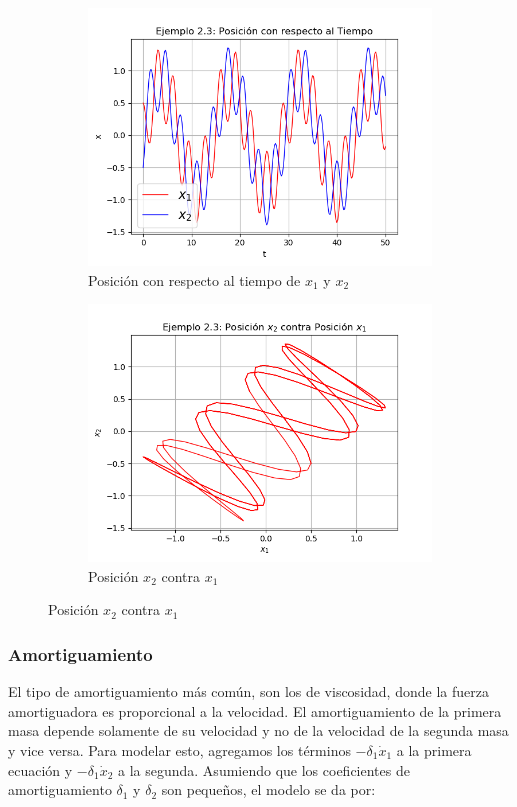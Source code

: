 \documentclass[a4paper]{article}
\begin{document}
\begin{figure}[ht!]
\begin{subfigure}{0.6\textwidth}
  \centering
  \includegraphics[width=\linewidth]{ejemplo_2_3_1.png}
  \caption{Posición con respecto al tiempo de $x_1$ y $x_2$}
\end{subfigure}
\begin{subfigure}{0.6\textwidth}
  \centering
  \includegraphics[width=\linewidth]{ejemplo_2_3_4.png}
  \caption{Posición $x_2$ contra $x_1$}
\end{subfigure}
\end{figure}

\subsubsection{Amortiguamiento}
El tipo de amortiguamiento más común, son los de viscosidad, donde la fuerza amortiguadora es proporcional a la velocidad. El amortiguamiento de la primera masa depende solamente de su velocidad y no de la velocidad de la segunda masa y vice versa. Para modelar esto, agregamos los términos $-\delta_1\dot x_1$ a la primera ecuación y $-\delta_1\dot x_2$ a la segunda. Asumiendo que los coeficientes de amortiguamiento $\delta_1$ y $\delta_2$ son pequeños, el modelo se da por:
\end{document}
